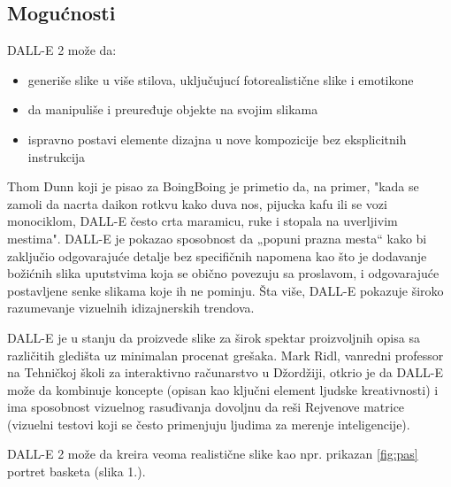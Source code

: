 \documentclass[a4paper]{article}
\begin{document}
\subsection{Mogućnosti}
\label{subsec:mogućnosti}

DALL-E 2 može da:
\begin{itemize}
\item generiše slike u više stilova, uključujucí fotorealistične slike i emotikone
\item da manipuliše i preuređuje objekte na svojim slikama
\item ispravno postavi elemente dizajna u nove kompozicije bez eksplicitnih instrukcija
\end{itemize} 

Thom Dunn koji je pisao za BoingBoing je primetio da, na primer, "kada se zamoli da nacrta daikon rotkvu kako duva nos, pijucka kafu ili se vozi monociklom, DALL-E često crta maramicu, ruke i stopala na uverljivim mestima". DALL-E je pokazao sposobnost da „popuni prazna mesta“ kako bi zaključio odgovarajuće detalje bez specifičnih napomena kao što je dodavanje božićnih slika uputstvima koja se obično povezuju sa proslavom, i odgovarajuće postavljene senke slikama koje ih ne pominju. Šta više, DALL-E pokazuje široko razumevanje vizuelnih idizajnerskih trendova.

DALL-E je u stanju da proizvede slike za širok spektar proizvoljnih opisa sa različitih gledišta uz minimalan procenat grešaka. Mark Ridl, vanredni professor na Tehničkoj školi za interaktivno računarstvo u Džordžiji, otkrio je da DALL-E može da kombinuje koncepte (opisan kao ključni element ljudske kreativnosti) i ima sposobnost vizuelnog rasuđivanja dovoljnu da reši Rejvenove matrice (vizuelni testovi koji se često primenjuju ljudima za merenje inteligencije).

DALL-E 2 može da kreira veoma realistične slike kao npr. prikazan \ref{fig:pas} portret basketa (slika 1.).
\end{document}
